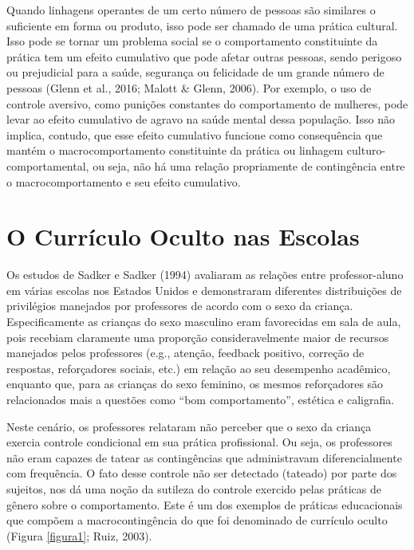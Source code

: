 Quando linhagens operantes de um certo número de pessoas são similares o suficiente em forma ou produto, isso pode ser chamado de uma prática cultural. Isso pode se tornar um problema social se o comportamento constituinte da prática tem um efeito cumulativo que pode afetar outras pessoas, sendo perigoso ou prejudicial para a saúde, segurança ou felicidade de um grande número de pessoas (Glenn et al., 2016; Malott \& Glenn, 2006). Por exemplo, o uso de controle aversivo, como punições constantes do comportamento de mulheres, pode levar ao efeito cumulativo de agravo na saúde mental dessa população. Isso não implica, contudo, que esse efeito cumulativo funcione como consequência que mantém o macrocomportamento constituinte da prática ou linhagem culturo-comportamental, ou seja, não há uma relação propriamente de contingência entre o macrocomportamento e seu efeito cumulativo.

\section{O Currículo Oculto nas Escolas}

Os estudos de Sadker e Sadker (1994) avaliaram as relações entre professor-aluno em várias escolas nos Estados Unidos e demonstraram diferentes distribuições de privilégios manejados por professores de acordo com o sexo da criança. Especificamente as crianças do sexo masculino eram favorecidas em sala de aula, pois recebiam claramente uma proporção consideravelmente maior de recursos manejados pelos professores (e.g., atenção, feedback positivo, correção de respostas, reforçadores sociais, etc.) em relação ao seu desempenho acadêmico, enquanto que, para as crianças do sexo feminino, os mesmos reforçadores são relacionados mais a questões como “bom comportamento”, estética e caligrafia.

Neste cenário, os professores relataram não perceber que o sexo da criança exercia controle condicional em sua prática profissional. Ou seja, os professores não eram capazes de tatear as contingências que administravam diferencialmente com frequência. O fato desse controle não ser detectado (tateado) por parte dos sujeitos, nos dá uma noção da sutileza do controle exercido pelas práticas de gênero sobre o comportamento. Este é um dos exemplos de práticas educacionais que compõem a macrocontingência do que foi denominado de currículo oculto (Figura \ref{figura1}; Ruiz, 2003).

